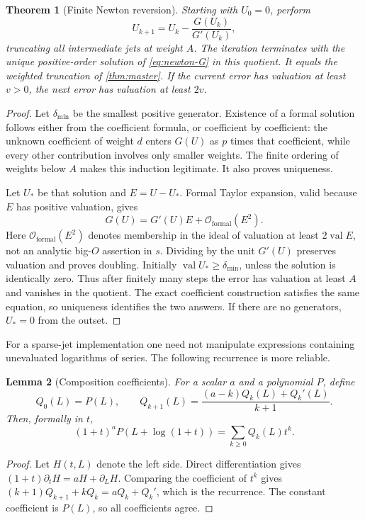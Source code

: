 \documentclass[11pt,a4paper]{article}
\numberwithin{equation}{section}
\newtheorem{theorem}{Theorem}[section]
\newtheorem{lemma}[theorem]{Lemma}
\theoremstyle{definition}
\newcommand{\OO}{\mathcal O}
\DeclareMathOperator{\val}{val}
\begin{document}
\begin{theorem}[Finite Newton reversion]\label{thm:newton}
Starting with $U_0=0$, perform
\begin{equation}\label{eq:newton-step}
 U_{k+1}=U_k-\frac{G(U_k)}{G'(U_k)},
\end{equation}
truncating all intermediate jets at weight $A$. The iteration terminates
with the unique positive-order solution of \eqref{eq:newton-G} in this
quotient. It equals the weighted truncation of \cref{thm:master}.
If the current error has valuation at least $v>0$, the next error has
valuation at least $2v$.
\end{theorem}
\begin{proof}
Let $\delta_{\min}$ be the smallest positive generator. Existence of a
formal solution follows either from the coefficient formula, or
coefficient by coefficient: the unknown coefficient of weight $d$ enters
$G(U)$ as $p$ times that coefficient, while every other contribution
involves only smaller weights. The finite ordering of weights below $A$
makes this induction legitimate. It also proves uniqueness.

Let $U_*$ be that solution and $E=U-U_*$. Formal Taylor expansion, valid
because $E$ has positive valuation, gives
\[
 G(U)=G'(U)E+\OO_{\mathrm{formal}}(E^2).
\]
Here $\OO_{\mathrm{formal}}(E^2)$ denotes membership in the ideal of
valuation at least $2\val E$, not an analytic big-$O$ assertion in $s$.
Dividing by the unit $G'(U)$ preserves valuation and proves doubling.
Initially $\val U_*\ge\delta_{\min}$, unless the solution is identically
zero. Thus after finitely many steps the error has valuation at least
$A$ and vanishes in the quotient. The exact coefficient construction
satisfies the same equation, so uniqueness identifies the two answers.
If there are no generators, $U_*=0$ from the outset.
\end{proof}

For a sparse-jet implementation one need not manipulate expressions
containing unevaluated logarithms of series. The following recurrence is
more reliable.

\begin{lemma}[Composition coefficients]\label{lem:composition}
For a scalar $a$ and a polynomial $P$, define
\[
 Q_0(L)=P(L),\qquad
 Q_{k+1}(L)=\frac{(a-k)Q_k(L)+Q_k'(L)}{k+1}.
\]
Then, formally in $t$,
\begin{equation}\label{eq:composition}
 (1+t)^a P(L+\log(1+t))=\sum_{k\ge0}Q_k(L)t^k.
\end{equation}
\end{lemma}
\begin{proof}
Let $H(t,L)$ denote the left side. Direct differentiation gives
$(1+t)\partial_tH=aH+\partial_LH$. Comparing the coefficient of $t^k$
gives $(k+1)Q_{k+1}+kQ_k=aQ_k+Q_k'$, which is the recurrence.
The constant coefficient is $P(L)$, so all coefficients agree.
\end{proof}
\end{document}
